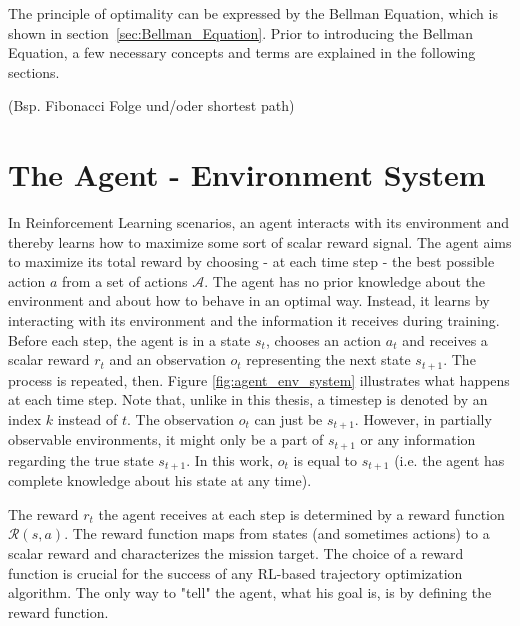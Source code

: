 The principle of optimality can be expressed by the Bellman Equation, which is shown in section~\ref{sec:Bellman_Equation}. Prior to introducing the Bellman Equation, a few necessary concepts and terms are explained in the following sections.

(Bsp. Fibonacci Folge und/oder shortest path)

\section{The Agent - Environment System}

In Reinforcement Learning scenarios, an agent interacts with its environment and thereby learns how to maximize some sort of scalar reward signal. The agent aims to maximize its total reward by choosing - at each time step - the best possible action $a$ from a set of actions $\mathcal{A}$. 
The agent has no prior knowledge about the environment and about how to behave in an optimal way. Instead, it learns by interacting with its environment and the information it receives during training. Before each step, the agent is in a state $s_t$, chooses an action $a_t$ and receives a scalar reward $r_t$ and an observation $o_t$ representing the next state $s_{t+1}$. The process is repeated, then. Figure \ref{fig:agent_env_system} illustrates what happens at each time step. Note that, unlike in this thesis, a timestep is denoted by an index $k$ instead of $t$. The observation $o_t$ can just be $s_{t+1}$. However, in partially observable environments, it might only be a part of $s_{t+1}$ or any information regarding the true state $s_{t+1}$. In this work, $o_t$ is equal to $s_{t+1}$ (i.e. the agent has complete knowledge about his state at any time).

The reward $r_t$ the agent receives at each step is determined by a reward function $\mathcal{R}(s,a)$. The reward function maps from states (and sometimes actions) to a scalar reward and characterizes the mission target. The choice of a reward function is crucial for the success of any RL-based trajectory optimization algorithm. The only way to "tell" the agent, what his goal is, is by defining the reward function. 

